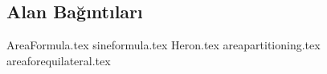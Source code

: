 \subsection{Alan Bağıntıları}
{AreaFormula.tex}
\newpage
{sineformula.tex}
\newpage
{Heron.tex}
\newpage
{areapartitioning.tex}
\newpage
{areaforequilateral.tex}
\newpage